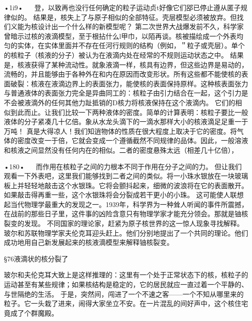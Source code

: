 •1i9•
  
登，以致再也没行任何确定的粒子运动贞t好像它们郘已停止遵从匿子规律似的。
结果是，核失上了与原子相似的全部特征。壳层模型必须被放弃。但找们义能为核设计出一个什么样的新模型呢？
第二次世界大战爆发前不久，科学家曾暗示过核的液滴模型，至于根拈什么l甲巾，以陌再谈。核被描绘成一个外表均匀的实体，在实体里面并不存在任河行规则的结构（例如，＂粒子或壳层）。单个的核粒子（核液的分子）被认为在液滴内处在经常的不规则运动状态之中。
结果是，核液获得了某种流动性。就象液滴一样，核具有边界，但这些边界是易动的，流畅的，并且能够由于各种外在和内在原因而改变形状。所有这些都不能使核的表面破裂：核液在液滴边界上的表面张力，能使核的表面保持原样。这种核表面张力与普通液体的表面张力完全是异曲同工的：核粒子由引力结合在一起，这个引力是不会被液滴外的任何其他力趾抵销的D核力将核液保持在这个液滴内。
它们的相似到此而止。让我们比较一下两种液体的密度。简单的计算表明：核粒子要比一般液体的分子紧凑几十亿倍。象从水龙头滴下的一滴水那样大小的核液滴足足重一于万吨！
真是大得凉人！我们知逍物体的性质在很大程度上取决于它的密度。将气体的密度改变一于倍，它就会变成一个遵循截然不同规律的品体。因此，一般溶液和核液之间显然没有任何内在的相似。二者的密度悬殊太远（相差几十亿倍），

•180•
  
而作用在核粒子之间的力根本不同于作用在分子之间的力。
但让我们观看一下外表吧，这里我们能够找到二者之间的类似。将一小珠水银放在一块玻璃板上并轻轻地敲击这个水银珠。它将会颤抖起来，细微的波浪将在它的表面散开。如果敲击得再重一些，这个水银珠将会分裂成若干更小的小珠。
这可能使人联想起当代物理学最重大的发现之一。1939年，科学界为一种耸人听闻的事件所震撼，在战前的那些日子里，这件事的凶险含意只有物理学家才能充分领会。那就是铀核裂变的发现。
不同国家的理论家，赶紧为原子核世界的这一惊人现象寻找解释。玻尔和苏联物理学家夫伦克耳迎头赶上。他们分别地提出了一个共同的理论。他们成功地用自己新发展起来的核液滴模型来解释铀核裂变。

§76液滴状的核分裂了

玻尔和夫伦克耳大致上是这样推理的：这里有一个处于正常状态下的核，核粒子的运动甚至有某些规律；如果核结构是稳定的，它的居民就应一直过着一个平静的、与世隔绝的生活。
于是，突然间，闯进了一个不速之客——一个不知从哪里来的粒子。它一头栽了进来，闹得大家坐立不安。在一片混乱的间好声中，这个核住宅竟成了个群魔殿。

